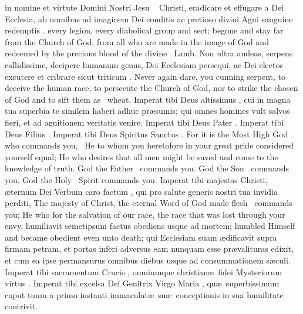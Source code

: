 \twoCols
{in nomine et virtute Domini Nostri Jesu \grecross~ Christi, eradicare et effugare a Dei Ecclesia, ab omnibus ad imaginem Dei conditis ac pretioso divini Agni sanguine redemptis \grecross. }
{every legion, every diabolical group and sect; begone and stay far from the Church of God, from all who are made in the image of God and redeemed by the precious blood of the divine \grecross~Lamb.}
\twoCols
{Non ultra audeas, serpens callidissime, decipere humanum ge\-nus, Dei Ecclesiam persequi, ac Dei electos excutere et cribrare sicut triticum \grecross.  
}{Never again dare, you cunning serpent, to deceive the human race, to persecute the Church of God, nor to strike the chosen of God and to sift them as \grecross~wheat. 
}
\twoCols
{Imperat tibi Deus altissimus \grecross, cui in magna tua superbia te similem haberi adhuc pr\ae sumis; qui omnes homines vult salvos fieri, et ad agnitionem veritatis venire. Imperat tibi Deus Pater \grecross. Imperat tibi Deus Filius \grecross. Imperat tibi Deus Spiritus Sanctus \grecross. 
}{For it is the Most High God who commands you, \grecross~He to whom you heretofore in your great pride considered yourself equal; He who desires that all men might be saved and come to the knowledge of truth. God the Father \grecross~commands you. God the Son \grecross~commands you. God the Holy \grecross~Spirit commands you. 
}
\twoCols
{Imperat tibi majestas Christi, \ae ternum Dei Verbum caro factum \grecross,  qui pro salute generis nostri tua invidia perditi,
}{The majesty of Christ, the eternal Word of God made flesh \grecross~commands you; He who for the salvation of our race, the race that was lost through your envy, 
}\twoCols
{ humiliavit semetipsum factus obediens usque ad mortem;
}{humbled Himself and became obedient even unto death;
}
\twoCols
{qui Ecclesiam suam \ae dificavit supra firmam petram, et portas inferi adversus eam nunquam esse pr\ae valituras edixit, et cum ea ipse permansurus omnibus diebus usque ad consummationem s\ae culi. Imperat tibi sacramentum Crucis \grecross, omniumque christian\ae \ fidei Mysteriorum virtus \grecross. Imperat tibi excelsa Dei Genitrix Virgo Maria \grecross, qu\ae \ superbissimum caput tuum a primo instanti immaculat\ae \ su\ae \ conceptionis in sua humilitate contrivit. }
